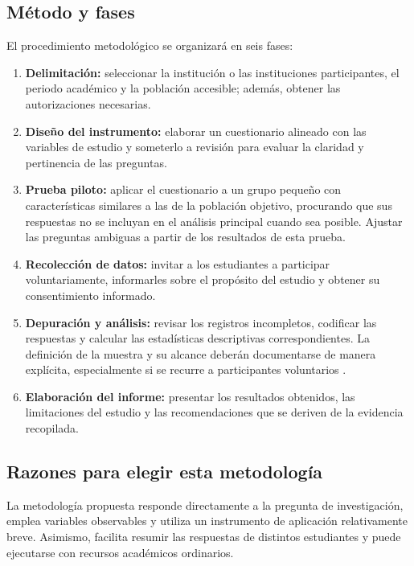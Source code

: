 \subsection{Método y fases}

El procedimiento metodológico se organizará en seis fases:

\begin{enumerate}
    \item \textbf{Delimitación:} seleccionar la institución o las instituciones participantes, el periodo académico y la población accesible; además, obtener las autorizaciones necesarias.

    \item \textbf{Diseño del instrumento:} elaborar un cuestionario alineado con las variables de estudio y someterlo a revisión para evaluar la claridad y pertinencia de las preguntas.

    \item \textbf{Prueba piloto:} aplicar el cuestionario a un grupo pequeño con características similares a las de la población objetivo, procurando que sus respuestas no se incluyan en el análisis principal cuando sea posible. Ajustar las preguntas ambiguas a partir de los resultados de esta prueba.

    \item \textbf{Recolección de datos:} invitar a los estudiantes a participar voluntariamente, informarles sobre el propósito del estudio y obtener su consentimiento informado.

    \item \textbf{Depuración y análisis:} revisar los registros incompletos, codificar las respuestas y calcular las estadísticas descriptivas correspondientes. La definición de la muestra y su alcance deberán documentarse de manera explícita, especialmente si se recurre a participantes voluntarios \parencite{argibay2009muestra}.

    \item \textbf{Elaboración del informe:} presentar los resultados obtenidos, las limitaciones del estudio y las recomendaciones que se deriven de la evidencia recopilada.
\end{enumerate}

\subsection{Razones para elegir esta metodología}

La metodología propuesta responde directamente a la pregunta de investigación, emplea variables observables y utiliza un instrumento de aplicación relativamente breve. Asimismo, facilita resumir las respuestas de distintos estudiantes y puede ejecutarse con recursos académicos ordinarios.

